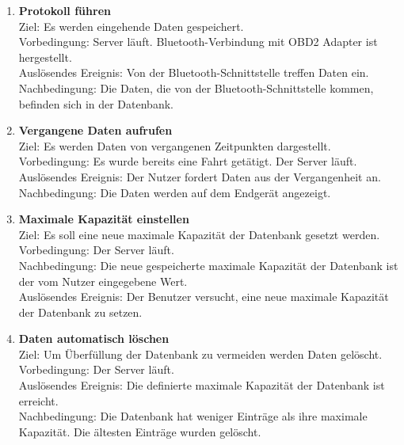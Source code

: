 \documentclass[pflichtenheft.tex]{subfiles}
\begin{document}
	\begin{enumerate}
		\setcounter{enumi}{\value{enumTemp}}
		\item{\textbf{Protokoll führen}} \\ Ziel: Es werden eingehende Daten gespeichert. \\ Vorbedingung: Server läuft. Bluetooth-Verbindung mit OBD2 Adapter ist hergestellt. \\ Auslösendes Ereignis: Von der Bluetooth-Schnittstelle treffen Daten ein. %
		Nachbedingung: Die Daten, die von der Bluetooth-Schnittstelle kommen, befinden sich in der Datenbank.
		
		\item{\textbf{Vergangene Daten aufrufen}} \label{pastData} \\ Ziel: Es werden Daten von vergangenen Zeitpunkten dargestellt. \\ Vorbedingung: Es wurde bereits eine Fahrt getätigt. Der Server läuft.\\ Auslösendes Ereignis: Der Nutzer fordert Daten aus der Vergangenheit an. \\ Nachbedingung: Die Daten werden auf dem Endgerät angezeigt.
	
		\item{\textbf{Maximale Kapazität einstellen}} \\ Ziel: Es soll eine neue maximale Kapazität der Datenbank gesetzt werden. \\ Vorbedingung: Der Server läuft. \\Nachbedingung: Die neue gespeicherte maximale Kapazität der Datenbank ist der vom Nutzer eingegebene Wert. \\Auslösendes Ereignis: Der Benutzer versucht, eine neue maximale Kapazität der Datenbank zu setzen. 
		
		\item{\textbf{Daten automatisch löschen}} \label{deleteData} \\ Ziel: Um Überfüllung der Datenbank zu vermeiden werden Daten gelöscht. \\ Vorbedingung: Der Server läuft. \\ Auslösendes Ereignis: Die definierte maximale Kapazität der Datenbank ist erreicht. \\ Nachbedingung: Die Datenbank hat weniger Einträge als ihre maximale Kapazität. Die ältesten Einträge wurden gelöscht.

		\renewcommand{\theenumi}{/FA\ifnum \value{enumi}<10 0\fi\arabic{enumi}0W/}
		\renewcommand{\labelenumi}{\theenumi}
		\renewcommand{\theenumii}{\arabic{enumii}}
		\renewcommand{\labelenumii}{/FA\ifnum \value{enumi}<10 0\fi\arabic{enumi}\arabic{enumii}W/}


\end{enumerate}
\end{document}
